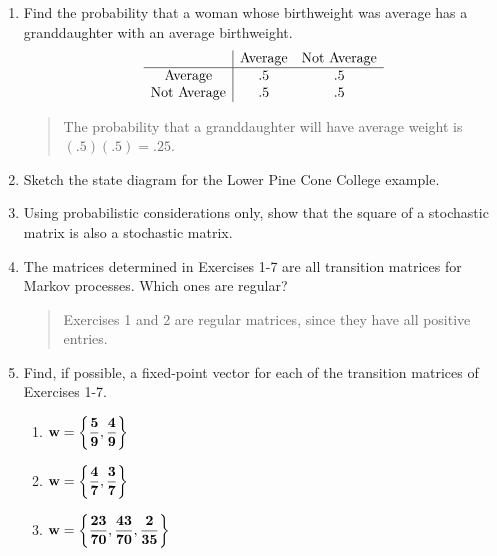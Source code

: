 \documentclass{hw}
\begin{document}
\begin{enumerate}
\item Find the probability that a woman whose birthweight was average has a granddaughter with an
average birthweight.
\[
\begin{array}{c | c c}
& \text{Average} & \text{Not Average}\\
\hline
\text{Average} & .5 & .5\\
\text{Not Average} & .5 & .5
\end{array}
\]
\begin{quote}
The probability that a granddaughter will have average weight is $(.5)(.5)=.25$.
\end{quote}

\item Sketch the state diagram for the Lower Pine Cone College example.
\begin{center}
\end{center}

\setcounter{enumi}{10}

\item Using probabilistic considerations only, show that the square of a stochastic matrix is also a
stochastic matrix.
\begin{quote}

\end{quote}

\setcounter{enumi}{20}
\item The matrices determined in Exercises 1-7 are all transition matrices for Markov processes.
Which ones are regular?
\begin{quote}
Exercises 1 and 2 are regular matrices, since they have all positive entries.
\end{quote}

\item Find, if possible, a fixed-point vector for each of the transition matrices of Exercises 1-7.
\begin{enumerate}
\item $\displaystyle \bf{w}=\left\{{5\over9}, {4\over9}\right\}$
\item $\displaystyle \bf{w}=\left\{{4\over7}, {3\over7}\right\}$
\item $\displaystyle \bf{w}=\left\{{23\over70}, {43\over70}, {2\over35}\right\}$
\end{enumerate}
\end{enumerate}
\end{document}
